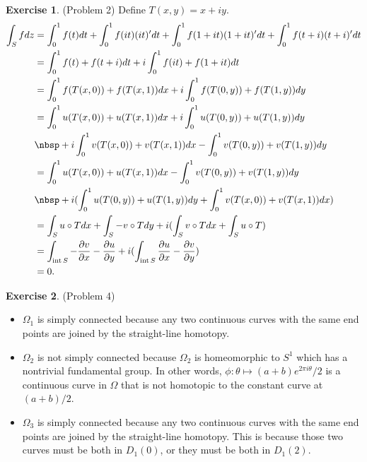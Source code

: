 \documentclass[12pt, psamsfonts]{amsart}
\theoremstyle{definition}
\newtheorem*{exer}{Exercise}
\theoremstyle{remark}
\DeclareMathOperator{\Int}{int}
\numberwithin{equation}{section}
\begin{document}
\begin{exer}{(Problem 2)}
  Define $T(x, y) = x + iy$.
  \begin{align*}
    \int_{S} fdz
      &= \int_{0}^{1} f(t)dt + \int_{0}^{1} f(it)(it)'dt + \int_{0}^{1} f(1 + it)(1 + it)'dt + \int_{0}^{1} f(t + i)(t + i)'dt \\
      &= \int_{0}^{1} f(t) + f(t + i)dt + i\int_{0}^{1} f(it) + f(1 + it) dt \\
      &= \int_{0}^{1} f(T(x, 0)) + f(T(x, 1)) dx + i\int_{0}^{1} f(T(0, y)) + f(T(1, y)) dy \\
      &= \int_{0}^{1} u(T(x, 0)) + u(T(x, 1)) dx + i\int_{0}^{1} u(T(0, y)) + u(T(1, y)) dy  \\
      &\nbsp + i\int_{0}^{1} v(T(x, 0)) + v(T(x, 1)) dx - \int_{0}^{1} v(T(0, y)) + v(T(1, y)) dy \\
      &= \int_{0}^{1} u(T(x, 0)) + u(T(x, 1)) dx - \int_{0}^{1} v(T(0, y)) + v(T(1, y)) dy \\
      &\nbsp + i(\int_{0}^{1} u(T(0, y)) + u(T(1, y)) dy + \int_{0}^{1} v(T(x, 0)) + v(T(x, 1)) dx) \\
      &= \int_{S} u \circ T dx + \int_{S} -v \circ T dy + i(\int_{S} v \circ T dx + \int_{S} u \circ T) \\
      &= \int_{\Int S} -\frac{\partial v}{\partial x} - \frac{\partial u}{\partial y} + i(\int_{\Int S} \frac{\partial u}{\partial x} - \frac{\partial v}{\partial y}) \\
      &= 0.
  \end{align*}

\end{exer}

\begin{exer}{(Problem 4)}
  \begin{itemize}
    \item
      $\Omega_1$ is simply connected because any two continuous curves with the same end points are joined by the straight-line homotopy.
    \item
      $\Omega_2$ is not simply connected because $\Omega_2$ is homeomorphic to $S^1$ which has a nontrivial fundamental group.
      In other words, $\phi: \theta \mapsto (a + b)e^{2\pi i\theta}/2$ is a continuous curve in $\Omega$ that is not homotopic to the constant curve at $(a + b) / 2$.
    \item
      $\Omega_3$ is simply connected because any two continuous curves with the same end points are joined by the straight-line homotopy.
      This is because those two curves must be both in $D_1(0)$, or they must be both in $D_1(2)$.
  \end{itemize}
\end{exer}
\end{document}
